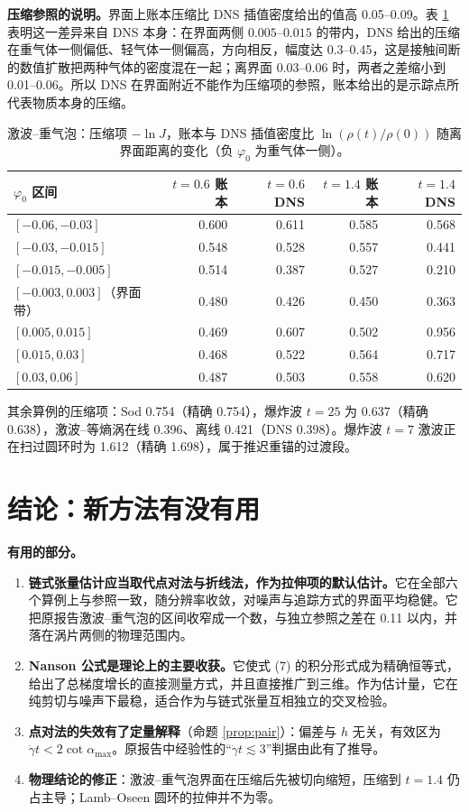 \documentclass[10.5pt,a4paper]{article}
\theoremstyle{plain}
\begin{document}
\textbf{压缩参照的说明。}界面上账本压缩比 DNS 插值密度给出的值高 0.05–0.09。表 \ref{tab:compchk} 表明这一差异来自 DNS 本身：在界面两侧 $0.005$–$0.015$ 的带内，DNS 给出的压缩在重气体一侧偏低、轻气体一侧偏高，方向相反，幅度达 0.3–0.45，这是接触间断的数值扩散把两种气体的密度混在一起；离界面 $0.03$–$0.06$ 时，两者之差缩小到 0.01–0.06。所以 DNS 在界面附近不能作为压缩项的参照，账本给出的是示踪点所代表物质本身的压缩。

\begin{table}[H]\centering\small
\caption{激波–重气泡：压缩项 $-\ln J$，账本与 DNS 插值密度比 $\ln(\rho(t)/\rho(0))$ 随离界面距离的变化（负 $\varphi_0$ 为重气体一侧）。}\label{tab:compchk}
\begin{tabular}{lrrrr}\toprule
$\varphi_0$ 区间 & $t=0.6$ 账本 & $t=0.6$ DNS & $t=1.4$ 账本 & $t=1.4$ DNS \\\midrule
$[-0.06,-0.03]$ & 0.600 & 0.611 & 0.585 & 0.568 \\
$[-0.03,-0.015]$ & 0.548 & 0.528 & 0.557 & 0.441 \\
$[-0.015,-0.005]$ & 0.514 & 0.387 & 0.527 & 0.210 \\
$[-0.003,0.003]$（界面带） & 0.480 & 0.426 & 0.450 & 0.363 \\
$[0.005,0.015]$ & 0.469 & 0.607 & 0.502 & 0.956 \\
$[0.015,0.03]$ & 0.468 & 0.522 & 0.564 & 0.717 \\
$[0.03,0.06]$ & 0.487 & 0.503 & 0.558 & 0.620 \\\bottomrule
\end{tabular}
\end{table}

其余算例的压缩项：Sod 0.754（精确 0.754），爆炸波 $t=25$ 为 0.637（精确 0.638），激波–等熵涡在线 0.396、离线 0.421（DNS 0.398）。爆炸波 $t=7$ 激波正在扫过圆环时为 1.612（精确 1.698），属于推迟重锚的过渡段。

\section{结论：新方法有没有用}

\textbf{有用的部分。}
\begin{enumerate}
\item \textbf{链式张量估计应当取代点对法与折线法，作为拉伸项的默认估计。}它在全部六个算例上与参照一致，随分辨率收敛，对噪声与追踪方式的界面平均稳健。它把原报告激波–重气泡的区间收窄成一个数，与独立参照之差在 0.11 以内，并落在涡片两侧的物理范围内。
\item \textbf{Nanson 公式是理论上的主要收获。}它使式 (7) 的积分形式成为精确恒等式，给出了总梯度增长的直接测量方式，并且直接推广到三维。作为估计量，它在纯剪切与噪声下最稳，适合作为与链式张量互相独立的交叉检验。
\item \textbf{点对法的失效有了定量解释}（命题 \ref{prop:pair}）：偏差与 $h$ 无关，有效区为 $\dot\gamma t<2\cot\alpha_{\max}$。原报告中经验性的“$\dot\gamma t\lesssim3$”判据由此有了推导。
\item \textbf{物理结论的修正}：激波–重气泡界面在压缩后先被切向缩短，压缩到 $t=1.4$ 仍占主导；Lamb–Oseen 圆环的拉伸并不为零。
\end{enumerate}
\end{document}
